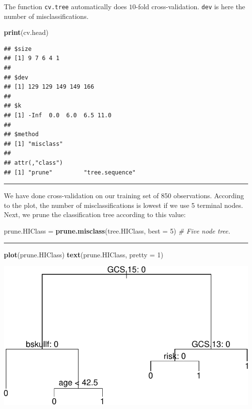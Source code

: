 \documentclass[]{article}
\newenvironment{Shaded}{\begin{snugshade}}{\end{snugshade}}
\newcommand{\CommentTok}[1]{\textcolor[rgb]{0.56,0.35,0.01}{\textit{#1}}}
\newcommand{\DataTypeTok}[1]{\textcolor[rgb]{0.13,0.29,0.53}{#1}}
\newcommand{\DecValTok}[1]{\textcolor[rgb]{0.00,0.00,0.81}{#1}}
\newcommand{\KeywordTok}[1]{\textcolor[rgb]{0.13,0.29,0.53}{\textbf{#1}}}
\newcommand{\NormalTok}[1]{#1}
\newcommand{\StringTok}[1]{\textcolor[rgb]{0.31,0.60,0.02}{#1}}
\begin{document}
The function \texttt{cv.tree} automatically does \(10\)-fold
cross-validation. \texttt{dev} is here the number of misclassifications.

\begin{Shaded}
\begin{Highlighting}[]
\KeywordTok{print}\NormalTok{(cv.head)}
\end{Highlighting}
\end{Shaded}

\begin{verbatim}
## $size
## [1] 9 7 6 4 1
## 
## $dev
## [1] 129 129 149 149 166
## 
## $k
## [1] -Inf  0.0  6.0  6.5 11.0
## 
## $method
## [1] "misclass"
## 
## attr(,"class")
## [1] "prune"         "tree.sequence"
\end{verbatim}

\begin{center}\rule{0.5\linewidth}{\linethickness}\end{center}

We have done cross-validation on our training set of 850 observations.
According to the plot, the number of misclassifications is lowest if we
use 5 terminal nodes. Next, we prune the classification tree according
to this value:

\begin{Shaded}
\begin{Highlighting}[]
\NormalTok{prune.HIClass =}\StringTok{ }\KeywordTok{prune.misclass}\NormalTok{(tree.HIClass, }\DataTypeTok{best =} \DecValTok{5}\NormalTok{)}
\CommentTok{# Five node tree.}
\end{Highlighting}
\end{Shaded}

\begin{center}\rule{0.5\linewidth}{\linethickness}\end{center}

\begin{Shaded}
\begin{Highlighting}[]
\KeywordTok{plot}\NormalTok{(prune.HIClass)}
\KeywordTok{text}\NormalTok{(prune.HIClass, }\DataTypeTok{pretty =} \DecValTok{1}\NormalTok{)}
\end{Highlighting}
\end{Shaded}

\includegraphics{8Trees_files/figure-latex/unnamed-chunk-21-1.pdf}
\end{document}
